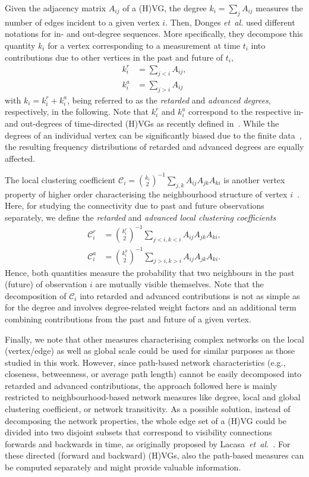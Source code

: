 		Given the adjacency matrix $A_{ij}$ of a (H)VG, the degree {$k_i =\sum_{j} A_{ij}$} measures the number of edges incident to a given vertex {$i$}. Then, Donges \textit{et~al.} \cite{Donges2013} used different notations for in- and out-degree sequences. More specifically, they decompose this quantity $k_i$ for a vertex corresponding to a measurement at time $t_i$ into contributions due to other vertices in the past and future of $t_i$,
\begin{eqnarray} \label{eq:kvin}
k_i^r &= \sum_{j<i} A_{ij},\\ \label{eq:kvout}
k_i^a &= \sum_{j>i} A_{ij}
\end{eqnarray}
with $k_i=k_i^r+k_i^a$, being referred to as the \emph{retarded} and \emph{advanced degrees}, respectively, in the following. Note that $k_i^r$ and $k_i^a$ correspond to the respective in- and out-degrees of time-directed (H)VGs as recently defined in~\cite{Lacasa2012}. While the degrees of an individual vertex can be significantly biased due to the finite data~\cite{Donner2012}, the resulting frequency distributions of retarded and advanced degrees are equally affected. 

		The local clustering coefficient $\mathcal{C}_i = {k_i \choose 2}^{-1} \sum_{j,k} A_{ij} A_{jk} A_{ki}$ is another vertex property of higher order characterising the neighbourhood structure of vertex $i$~\cite{Newman2003}. Here, for studying the connectivity due to past and future observations separately, we define the \emph{retarded} and \emph{{advanced local clustering coefficients}}
\begin{eqnarray} \label{eq:cvin}
\mathcal{C}_i^r &= {k_i^r \choose 2}^{-1} \sum_{{j<i,k<i}} A_{ij} A_{jk} A_{ki},\\ \label{eq:cvout}
\mathcal{C}_i^a &= {k_i^a \choose 2}^{-1} \sum_{{j>i,k>i}} A_{ij} A_{jk} A_{ki}.
\end{eqnarray}
Hence, both quantities measure the probability that two neighbours in the past (future) of observation $i$ are mutually visible themselves. Note that the decomposition of $\mathcal{C}_i$ into retarded and advanced contributions is not as simple as for the degree and involves degree-related weight factors and an additional term combining contributions from the past and future of a given vertex.

		Finally, {we note that} other measures characterising complex networks on the local (vertex/edge) as well as global scale could be used for similar purposes as {those} studied in this work. However, {since} path-based network characteristics {(e.g.,} closeness, betweenness, or average path length{)} cannot be easily decomposed into retarded and advanced contributions, the approach followed here is mainly restricted to neighbourhood-based network measures like degree, local and global clustering coefficient, or network transitivity. As a possible solution, instead of decomposing the network properties, the whole edge set of a (H)VG could be divided into two disjoint subsets that correspond to visibility connections forwards and backwards in time, as originally proposed by Lacasa~\textit{et~al.}~\cite{Lacasa2012}. For these directed (forward and backward) (H)VGs, also the path-based measures can be computed separately and might provide valuable information. 
		
